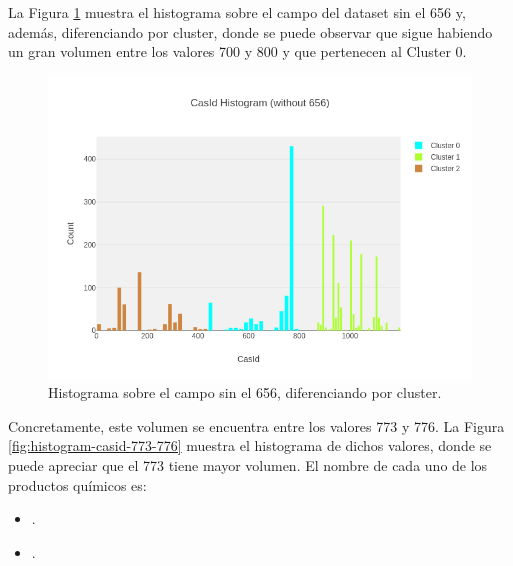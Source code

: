 La Figura \ref{fig:histogram-casid-without656} muestra el histograma sobre el campo  del dataset sin el  656 y, además, diferenciando por cluster, donde se puede observar que sigue habiendo un gran volumen entre los valores 700 y 800 y que pertenecen al Cluster 0.


\newpage
\begin{figure}[!th]
\includegraphics[scale=0.5]{figures/histogram-casid-without656}
\centering
\caption{Histograma sobre el campo  sin el  656, diferenciando por cluster.}
\label{fig:histogram-casid-without656}
\end{figure}

Concretamente, este volumen se encuentra entre los valores 773 y 776. La Figura \ref{fig:histogram-casid-773-776} muestra el histograma de dichos valores, donde se puede apreciar que el  773 tiene mayor volumen. El nombre de cada uno de los productos químicos es:

\begin{itemize}
 \item {}.
 \item {}.
\end{itemize}


